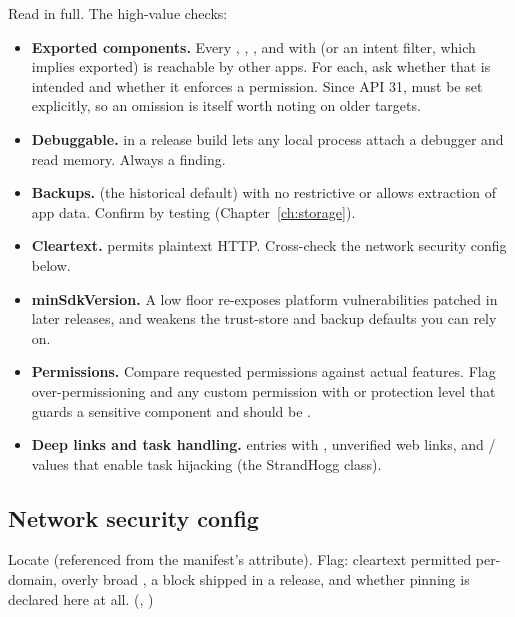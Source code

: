 Read  in full. The high-value checks:

\begin{itemize}
\item \textbf{Exported components.} Every , , , and  with  (or an intent filter, which implies exported) is reachable by other apps. For each, ask whether that is intended and whether it enforces a permission. Since API 31,  must be set explicitly, so an omission is itself worth noting on older targets.
\item \textbf{Debuggable.}  in a release build lets any local process attach a debugger and read memory. Always a finding.
\item \textbf{Backups.}  (the historical default) with no restrictive  or  allows  extraction of app data. Confirm by testing (Chapter~\ref{ch:storage}).
\item \textbf{Cleartext.}  permits plaintext HTTP. Cross-check the network security config below.
\item \textbf{minSdkVersion.} A low floor re-exposes platform vulnerabilities patched in later releases, and weakens the trust-store and backup defaults you can rely on.
\item \textbf{Permissions.} Compare requested permissions against actual features. Flag over-permissioning and any custom permission with  or  protection level that guards a sensitive component and should be .
\item \textbf{Deep links and task handling.}  entries with , unverified web links, and / values that enable task hijacking (the StrandHogg class).
\end{itemize}

\subsection{Network security config}
Locate  (referenced from the manifest's  attribute). Flag: cleartext permitted per-domain, overly broad , a  block shipped in a release, and whether pinning is declared here at all. (, )

